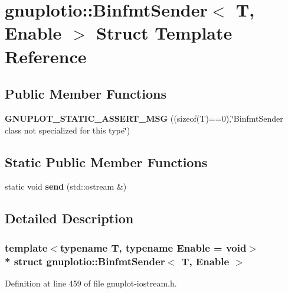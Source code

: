 \hypertarget{structgnuplotio_1_1_binfmt_sender}{}\section{gnuplotio\+:\+:Binfmt\+Sender$<$ T, Enable $>$ Struct Template Reference}
\label{structgnuplotio_1_1_binfmt_sender}
\subsection*{Public Member Functions}
\begin{DoxyCompactItemize}
\item 
{\bfseries G\+N\+U\+P\+L\+O\+T\+\_\+\+S\+T\+A\+T\+I\+C\+\_\+\+A\+S\+S\+E\+R\+T\+\_\+\+M\+SG} ((sizeof(T)==0),\char`\"{}Binfmt\+Sender class not specialized for this type\char`\"{})\hypertarget{structgnuplotio_1_1_binfmt_sender_ab0b554a2e81309917b2fa6f480e2a8e2}{}\label{structgnuplotio_1_1_binfmt_sender_ab0b554a2e81309917b2fa6f480e2a8e2}

\end{DoxyCompactItemize}
\subsection*{Static Public Member Functions}
\begin{DoxyCompactItemize}
\item 
static void {\bfseries send} (std\+::ostream \&)\hypertarget{structgnuplotio_1_1_binfmt_sender_a762010e3172c02e981252f93185b29c8}{}\label{structgnuplotio_1_1_binfmt_sender_a762010e3172c02e981252f93185b29c8}

\end{DoxyCompactItemize}


\subsection{Detailed Description}
\subsubsection*{template$<$typename T, typename Enable = void$>$\\*
struct gnuplotio\+::\+Binfmt\+Sender$<$ T, Enable $>$}



Definition at line 459 of file gnuplot-\/iostream.\+h.


